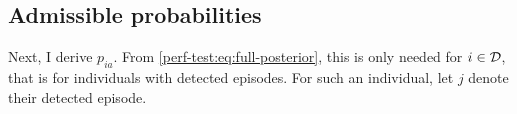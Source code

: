 \documentclass[thesis.tex]{subfiles}
\begin{document}

\subsection{Admissible probabilities}

Next, I derive $p_{ia}$.
From \cref{perf-test:eq:full-posterior}, this is only needed for $i \in \mathcal{D}$, that is for individuals with detected episodes.
For such an individual, let $j$ denote their detected episode.
\end{document}
